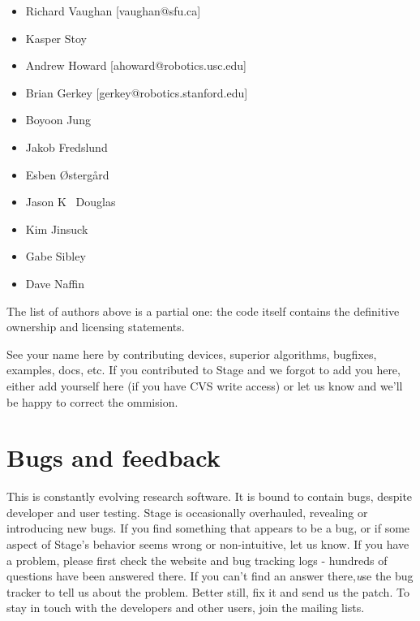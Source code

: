 \documentclass[letter,11pt,twoside]{report}
\begin{document}
\begin{itemize}
\item[] Richard Vaughan [vaughan@sfu.ca]
\item[] Kasper Stoy 
\item[] Andrew Howard [ahoward@robotics.usc.edu]
\item[] Brian Gerkey [gerkey@robotics.stanford.edu]
\item[] Boyoon Jung 
\item[] Jakob Fredslund
\item[] Esben \O{}sterg\aa{}rd
\item[] Jason K~ Douglas
\item[] Kim Jinsuck
\item[] Gabe Sibley
\item[] Dave Naffin
\end{itemize}

The list of authors above is a partial one: the code itself contains
the definitive ownership and licensing statements.

See your name here by contributing devices, superior algorithms,
bugfixes, examples, docs, etc. If you contributed to Stage and we
forgot to add you here, either add yourself here (if you have CVS
write access) or let us know and we'll be happy to correct the
ommision.

\section{Bugs and feedback}

This is constantly evolving research software. It is bound to contain
bugs, despite developer and user testing. Stage is occasionally
overhauled, revealing or introducing new bugs. If you find something
that appears to be a bug, or if some aspect of Stage's behavior seems
wrong or non-intuitive, let us know. If you have a problem, please
first check the website and bug tracking logs - hundreds of questions
have been answered there. If you can't find an answer there,{\emph use
the bug tracker} to tell us about the problem. Better still, fix it
and send us the patch. To stay in touch with the developers and other
users, join the mailing lists.
\end{document}
